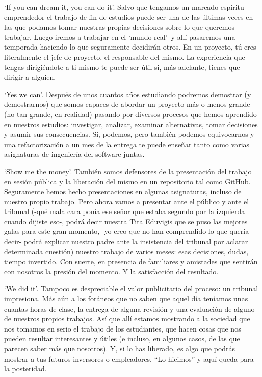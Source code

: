 \documentclass[twoside,10pt]{article}
\begin{document}
\begin{multicols}{2}
\noindent `If you can dream it, you can do it'. Salvo que tengamos un
  marcado esp\'iritu emprendedor el trabajo de fin de estudios puede ser
  una de las \'ultimas veces en las que podamos tomar nuestras propias
  decisiones sobre lo que queremos trabajar. Luego iremos a trabajar
  en el `mundo real'\textregistered\     y all\'i pasaremos una temporada
  haciendo lo que seguramente decidir\'an otros. En un proyecto, t\'u eres
  literalmente el jefe de proyecto, el responsable del mismo. La
  experiencia que tengas dirigi\'endote a ti mismo te puede ser \'util si,
  m\'as adelante, tienes que dirigir a alguien. 

`Yes we can'. Despu\'es de unos cuantos a\~nos estudiando podremos
  demostrar (y demostrarnos) que somos capaces de abordar un proyecto
  m\'as o menos grande (no tan grande, en realidad) pasando por diversos
  procesos que hemos aprendido en nuestros estudios: investigar,
  analizar, examinar alternativas, tomar decisiones y asumir sus
  consecuencias. S\'i, podemos, pero tambi\'en podemos equivocarnos y una
  refactorizaci\'on a un mes de la entrega te puede ense\~nar tanto como
  varias asignaturas de ingenier\'ia del software juntas. 

`Show me the money'. Tambi\'en somos defensores de la presentaci\'on del
  trabajo en sesi\'on p\'ublica y la liberaci\'on del mismo en un
  repositorio tal como GitHub. Seguramente hemos hecho presentaciones en
  algunas asignaturas, incluso de nuestro propio trabajo. Pero ahora
  vamos a presentar ante el p\'ublico y ante el tribunal (-qu\'e mala cara
  pon\'ia ese se\~nor que estaba segundo por la izquierda cuando dijiste
  eso-, podr\'a decir nuestra Tita Eduvigis que se puso las mejores
  galas para este gran momento, -yo creo que no han comprendido lo que
  quer\'ia decir- podr\'a explicar nuestro padre ante la insistencia del
  tribunal por aclarar determinada cuesti\'on) nuestro trabajo de varios
  meses: esas decisiones, dudas, tiempo invertido. Con suerte, en
  presencia de familiares y amistades que sentir\'an con nosotros la
  presi\'on del momento. Y la satisfacci\'on del resultado. 

`We did it'. Tampoco es despreciable el valor publicitario del
  proceso: un tribunal impresiona. M\'as a\'un a los for\'aneos que no saben
  que aquel d\'ia ten\'iamos unas cuantas horas de clase, la entrega de
  alguna revisi\'on y una evaluaci\'on de alguno de nuestros propios
  trabajos. As\'i que all\'i estamos mostrando a la sociedad que nos
  tomamos en serio el trabajo de los estudiantes, que hacen cosas que
  nos pueden resultar interesantes y \'utiles (e incluso, en algunos
  casos, de las que parecen saber m\'as que nosotros). Y, si lo has
  liberado, es algo que podr\'as mostrar a tus futuros inversores o
  empleadores. ``Lo hicimos'' y aqu\'i queda para la posteridad. 


\end{multicols}
\end{document}
